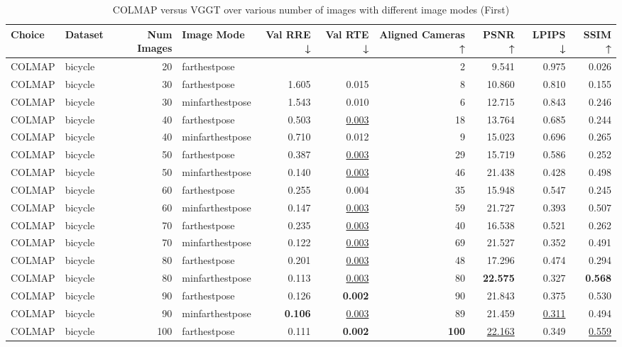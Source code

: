 \begin{table}[H]
\caption{\ifdefined\customcaption \customcaption \else COLMAP versus VGGT over various number of images with different image modes (First) \fi}
\label{tab:01_num_images_image_mode_first}
\centering
\scriptsize
\begin{tabular}{llrlrrrrrr}
\toprule
Choice & Dataset & Num Images & Image Mode & Val RRE ↓ & Val RTE ↓ & Aligned Cameras ↑ & PSNR ↑ & LPIPS ↓ & SSIM ↑ \\
\midrule
COLMAP & bicycle & 20 & farthestpose &  &  & 2 & 9.541 & 0.975 & 0.026 \\
COLMAP & bicycle & 30 & farthestpose & 1.605 & 0.015 & 8 & 10.860 & 0.810 & 0.155 \\
COLMAP & bicycle & 30 & minfarthestpose & 1.543 & 0.010 & 6 & 12.715 & 0.843 & 0.246 \\
COLMAP & bicycle & 40 & farthestpose & 0.503 & \underline{0.003} & 18 & 13.764 & 0.685 & 0.244 \\
COLMAP & bicycle & 40 & minfarthestpose & 0.710 & 0.012 & 9 & 15.023 & 0.696 & 0.265 \\
COLMAP & bicycle & 50 & farthestpose & 0.387 & \underline{0.003} & 29 & 15.719 & 0.586 & 0.252 \\
COLMAP & bicycle & 50 & minfarthestpose & 0.140 & \underline{0.003} & 46 & 21.438 & 0.428 & 0.498 \\
COLMAP & bicycle & 60 & farthestpose & 0.255 & 0.004 & 35 & 15.948 & 0.547 & 0.245 \\
COLMAP & bicycle & 60 & minfarthestpose & 0.147 & \underline{0.003} & 59 & 21.727 & 0.393 & 0.507 \\
COLMAP & bicycle & 70 & farthestpose & 0.235 & \underline{0.003} & 40 & 16.538 & 0.521 & 0.262 \\
COLMAP & bicycle & 70 & minfarthestpose & 0.122 & \underline{0.003} & 69 & 21.527 & 0.352 & 0.491 \\
COLMAP & bicycle & 80 & farthestpose & 0.201 & \underline{0.003} & 48 & 17.296 & 0.474 & 0.294 \\
COLMAP & bicycle & 80 & minfarthestpose & 0.113 & \underline{0.003} & 80 & \textbf{22.575} & 0.327 & \textbf{0.568} \\
COLMAP & bicycle & 90 & farthestpose & 0.126 & \textbf{0.002} & 90 & 21.843 & 0.375 & 0.530 \\
COLMAP & bicycle & 90 & minfarthestpose & \textbf{0.106} & \underline{0.003} & 89 & 21.459 & \underline{0.311} & 0.494 \\
COLMAP & bicycle & 100 & farthestpose & 0.111 & \textbf{0.002} & \textbf{100} & \underline{22.163} & 0.349 & \underline{0.559} \\

\end{tabular}
\end{table}
